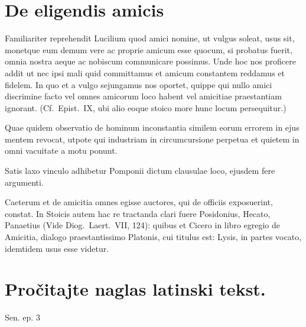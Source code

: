 


\section*{De eligendis amicis}

Familiariter reprehendit Lucilium quod amici nomine, ut vulgus soleat, usus sit, monetque eum demum vere ac proprie amicum esse quocum, si probatus fuerit, omnia nostra aeque ac nobiscum communicare possimus. Unde hoc nos proficere addit ut nec ipsi mali quid committamus et amicum constantem reddamus et fidelem. In quo et a vulgo sejungamus nos oportet, quippe qui nullo amici discrimine facto vel omnes amicorum loco habent vel amicitiae praestantiam ignorant. (Cf.\ Epist.\ IX, ubi alio eoque stoico more hunc locum persequitur.) 

Quae quidem observatio de hominum inconstantia similem eorum errorem in ejus mentem revocat, utpote qui industriam in circumcursione perpetua et quietem in omni vacuitate a motu ponunt. 

Satis laxo vinculo adhibetur Pomponii dictum clausulae loco, ejusdem fere argumenti. 

Caeterum et de amicitia omnes egisse auctores, qui de officiis exposuerint, constat. In Stoicis autem hac re tractanda clari fuere Posidonius, Hecato, Panaetius (Vide Diog.\ Laert.\ VII, 124): quibus et Cicero in libro egregio de Amicitia, dialogo praestantissimo Platonis, cui titulus est: Lysis, in partes vocato, idemtidem usus esse videtur.

\newpage

\section*{Pročitajte naglas latinski tekst.}


Sen. ep. 3

\medskip

